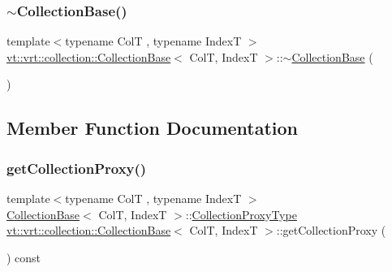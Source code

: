 \mbox{\label{structvt_1_1vrt_1_1collection_1_1_collection_base_aa343e5527cb05addb8bbb04994ebc23e}} 
\subsubsection{\texorpdfstring{$\sim$\+Collection\+Base()}{~CollectionBase()}}
{\footnotesize\ttfamily template$<$typename ColT , typename IndexT $>$ \\
\hyperlink{structvt_1_1vrt_1_1collection_1_1_collection_base}{vt\+::vrt\+::collection\+::\+Collection\+Base}$<$ ColT, IndexT $>$\+::$\sim$\hyperlink{structvt_1_1vrt_1_1collection_1_1_collection_base}{Collection\+Base} (\begin{DoxyParamCaption}{ }\end{DoxyParamCaption})\hspace{0.3cm}{\ttfamily [virtual]}}



\subsection{Member Function Documentation}
\mbox{\label{structvt_1_1vrt_1_1collection_1_1_collection_base_ad97d9ab1a28fb535c5d7f82c15e99791}} 
\subsubsection{\texorpdfstring{get\+Collection\+Proxy()}{getCollectionProxy()}}
{\footnotesize\ttfamily template$<$typename ColT , typename IndexT $>$ \\
\hyperlink{structvt_1_1vrt_1_1collection_1_1_collection_base}{Collection\+Base}$<$ ColT, IndexT $>$\+::\hyperlink{structvt_1_1vrt_1_1collection_1_1_collection_base_af40b40a2ee128748bcb917f14a0152b4}{Collection\+Proxy\+Type} \hyperlink{structvt_1_1vrt_1_1collection_1_1_collection_base}{vt\+::vrt\+::collection\+::\+Collection\+Base}$<$ ColT, IndexT $>$\+::get\+Collection\+Proxy (\begin{DoxyParamCaption}{ }\end{DoxyParamCaption}) const}

